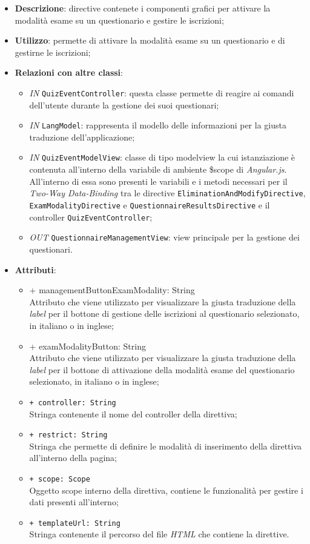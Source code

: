\begin{itemize}
	\item \textbf{Descrizione}: directive contenete i componenti grafici per attivare la modalità esame su un questionario e gestire le iscrizioni;
	\item \textbf{Utilizzo}: permette di attivare la modalità esame su un questionario e di gestirne le iscrizioni;
	\item \textbf{Relazioni con altre classi}:
	\begin{itemize}
		\item \textit{IN} \texttt{QuizEventController}: questa classe permette di reagire ai comandi dell'utente durante la gestione dei suoi questionari;
		\item \textit{IN} \texttt{LangModel}: rappresenta il modello delle informazioni per la giusta traduzione dell'applicazione;
		\item \textit{IN} \texttt{QuizEventModelView}: classe di tipo modelview la cui istanziazione è contenuta all'interno della variabile di ambiente \$scope di \textit{Angular.js}. All'interno di essa sono presenti le variabili e i metodi necessari per il \textit{Two-Way Data-Binding} tra le directive \texttt{EliminationAndModifyDirective}, \texttt{ExamModalityDirective} e \texttt{QuestionnaireResultsDirective} e il controller \texttt{QuizEventController};
		\item \textit{OUT} \texttt{QuestionnaireManagementView}: view principale per la gestione dei questionari.
	\end{itemize}
		\item \textbf{Attributi}:
		\begin{itemize}
			\item {+ managementButtonExamModality: String} \\ Attributo che viene utilizzato per visualizzare la giusta traduzione della \textit{label} per il bottone di gestione delle iscrizioni al questionario selezionato, in italiano o in inglese; 
			\item {+ examModalityButton: String} \\ Attributo che viene utilizzato per visualizzare la giusta traduzione della \textit{label} per il bottone di attivazione della modalità esame del questionario selezionato, in italiano o in inglese;
			\item \texttt{+ controller: String} \\ Stringa contenente il nome del controller della direttiva;
			\item \texttt{+ restrict: String} \\ Stringa che permette di definire le modalità di inserimento della direttiva all'interno della pagina;
			\item \texttt{+ scope: Scope} \\ Oggetto scope interno della direttiva, contiene le funzionalità per gestire i dati presenti all'interno;
			\item \texttt{+ templateUrl: String} \\ Stringa contenente il percorso del file \textit{HTML} che contiene la direttive.
		\end{itemize}
\end{itemize}